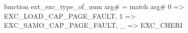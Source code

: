 function ext_exc_type_of_num arg# = match arg# {
  0 => EXC_LOAD_CAP_PAGE_FAULT,
  1 => EXC_SAMO_CAP_PAGE_FAULT,
  _ => EXC_CHERI
}
